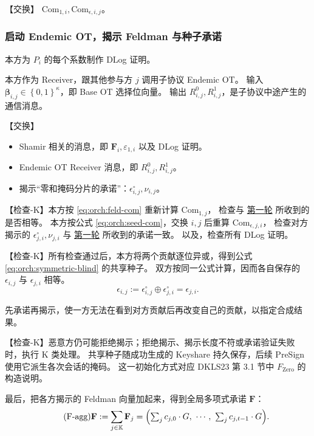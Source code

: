 【交换】 $\mathrm{Com}_{1,i}, \mathrm{Com}_{\epsilon,i,j}$。

\subsubsection{启动 Endemic OT，揭示 Feldman 与种子承诺}

本方为 $P_i$ 的每个系数制作 DLog 证明。

本方作为 Receiver，跟其他参与方 $j$ 调用子协议 Endemic OT。
输入 $\boldsymbol{\beta}_{i,j} \in \left\{0,1\right\}^\kappa$，即 Base OT 选择位向量。
输出 $R_{i,j}^0, R_{i,j}^1$，是子协议中途产生的通信消息。

【交换】
\begin{itemize}
\item
  Shamir 相关的消息，即 $\mathbf{F}_i, \varepsilon_{1,i}$ 以及 DLog 证明。
\item
  Endemic OT Receiver 消息，即 $R_{i,j}^0, R_{i,j}^1$。
\item
  揭示“零和掩码分片的承诺”：$\epsilon^\circ_{i,j},\nu_{i,j}$。
\end{itemize}

【检查-K】本方按 \eqref{eq:orch:feld-com} 重新计算 $\mathrm{Com}_{1,j}$，
检查与 \hyperref[sec:orchestration:round1]{第一轮} 所收到的是否相等。
本方按公式 \eqref{eq:orch:seed-com}，交换 $i,j$ 后重算 $\mathrm{Com}_{\epsilon,j,i}$，
检查对方揭示的 $\epsilon^\circ_{j,i},\nu_{j,i}$
与 \hyperref[sec:orchestration:round1]{第一轮} 所收到的承诺一致。
以及，检查所有 DLog 证明。

【检查-K】所有检查通过后，本方将两个贡献逐位异或，得到公式 \eqref{eq:orch:symmetric-blind} 的共享种子。
双方按同一公式计算，因而各自保存的 $\epsilon_{i,j}$ 与 $\epsilon_{j,i}$ 相等。
\begin{equation}
  \label{eq:orch:symmetric-blind}\tag{sym-blind}
  \epsilon_{i,j}:=\epsilon^\circ_{i,j}\oplus\epsilon^\circ_{j,i}
  =\epsilon_{j,i}.
\end{equation}

先承诺再揭示，使一方无法在看到对方贡献后再改变自己的贡献，以指定合成结果。

【检查-K】恶意方仍可能拒绝揭示；拒绝揭示、揭示长度不符或承诺验证失败时，执行 K 类处理。
共享种子随成功生成的 Keyshare 持久保存，后续 PreSign 使用它派生各次会话的掩码。
这一初始化方式对应 DKLS23 第 3.1 节中 $F_{\mathrm{Zero}}$ 的构造说明。

最后，把各方揭示的 Feldman 向量加起来，得到全局多项式承诺 $\mathbf{F}$：
\begin{equation}
\label{eq:orch:feld-agg}\tag{F-agg}
\mathbf{F} := \sum_{j\in\mathbb{K}} \mathbf{F}_j
= \Bigl(\textstyle\sum_j c_{j,0}\cdot G,\ \cdots,\ \sum_j c_{j,t-1}\cdot G\Bigr).
\end{equation}

